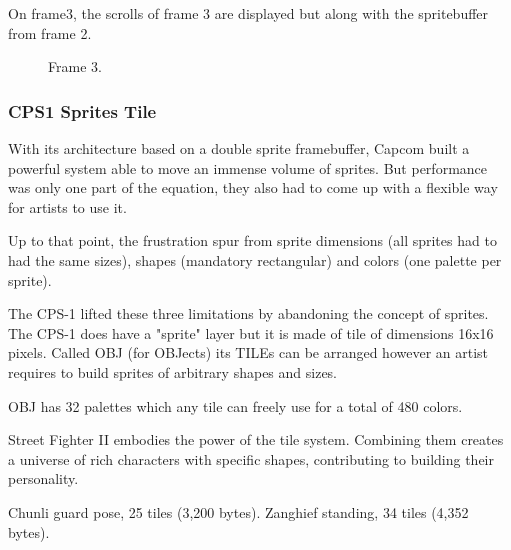 On frame3, the scrolls of frame 3 are displayed but along with the spritebuffer from frame 2.

\begin{figure}[H]
 \caption*{Frame 3.}%
 \end{figure}%





\subsubsection{CPS1 Sprites Tile}
With its architecture based on a double sprite framebuffer, Capcom built a powerful system able to move an immense volume of sprites. But performance was only one part of the equation, they also had to come up with a flexible way for artists to use it.

Up to that point, the frustration spur from sprite dimensions (all sprites had to had the same sizes), shapes (mandatory rectangular) and colors (one palette per sprite). 

The CPS-1 lifted these three limitations by abandoning the concept of sprites. The CPS-1 does have a "sprite" layer but it is made of tile of dimensions 16x16 pixels. Called OBJ (for OBJects) its TILEs can be arranged however an artist requires to build sprites of arbitrary shapes and sizes. 

OBJ has 32 palettes which any tile can freely use for a total of 480 colors.

\pagebreak

Street Fighter II embodies the power of the tile system. Combining them creates a universe of rich characters with specific shapes, contributing to building their personality.

\begin{minipage}[t]{0.453\linewidth}
\end{minipage}%
\hfill%
\begin{minipage}[t]{0.53\linewidth}
\end{minipage}



Chunli guard pose, 25 tiles (3,200 bytes). Zanghief standing, 34 tiles (4,352 bytes). 

\begin{minipage}[t]{0.3\linewidth}
\end{minipage}%
\hfill%
\begin{minipage}[t]{0.53\linewidth}
\end{minipage}

